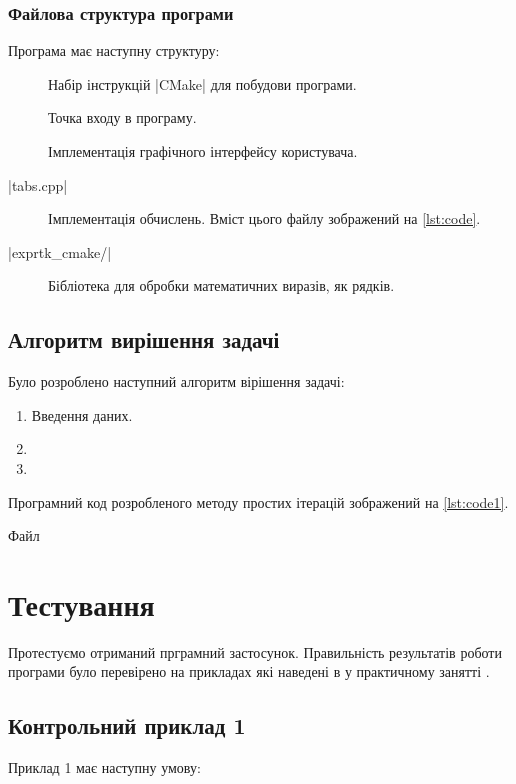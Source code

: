\documentclass[\mainDocument]{subfiles}
\begin{document}
	\subsection{Файлова структура програми}
	Програма має наступну структуру:
	\begin{description}
		\item[]
			Набір інструкцій \textinline|CMake| для побудови програми. 
		\item[]
			Точка входу в програму. 
		\item[]
			Імплементація графічного інтерфейсу користувача. 
		\item[\textinline|tabs.cpp|]
			Імплементація обчислень. Вміст цього файлу зображений на \cref{lst:code}.
		\item[\textinline|exprtk_cmake/|] Бібліотека для обробки математичних виразів, як рядків.
	\end{description}

	\section{Алгоритм вирішення задачі}
	Було розроблено наступний алгоритм вірішення задачі:
	\begin{enumerate}
		\item Введення даних. 
		\item
		\item
	\end{enumerate}	

	Програмний код розробленого методу простих ітерацій зображений на \cref{lst:code1}.
	\begin{longlisting}
		 \begin{Center}
		 \end{Center}
		 \caption{Файл }\label{lst:code1}
	\end{longlisting}

	\FloatBarrier
	\chapter{Тестування}
	Протестуємо отриманий прграмний застосунок. 
	Правильність результатів роботи програми було перевірено на прикладах які наведені в \cite{computational_methods} у практичному занятті \prodnumber{}.
	\section{Контрольний приклад 1}
	Приклад 1 має наступну умову:
\end{document}
